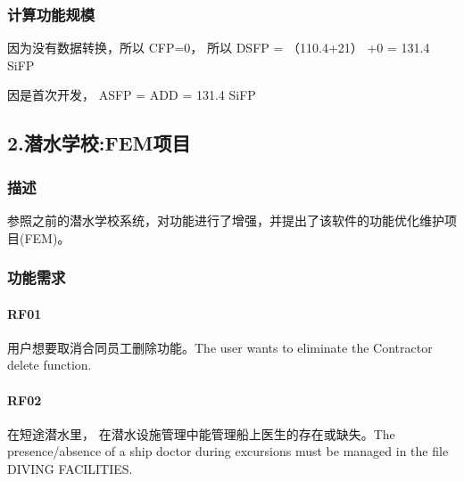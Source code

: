 \hypertarget{ux8ba1ux7b97ux529fux80fdux89c4ux6a21}{%
\subsubsection{计算功能规模}\label{ux8ba1ux7b97ux529fux80fdux89c4ux6a21}}

\begin{description}
\item[]
\end{description}

因为没有数据转换，所以 CFP=0， 所以 DSFP = （110.4+21） +0 = 131.4 SiFP

因是首次开发， ASFP = ADD = 131.4 SiFP

\hypertarget{ux6f5cux6c34ux5b66ux6821femux9879ux76ee}{%
\subsection{2.潜水学校:FEM项目}\label{ux6f5cux6c34ux5b66ux6821femux9879ux76ee}}

\hypertarget{ux63cfux8ff0}{%
\subsubsection{描述}\label{ux63cfux8ff0}}

参照之前的潜水学校系统，对功能进行了增强，并提出了该软件的功能优化维护项目(FEM)。

\hypertarget{ux529fux80fdux9700ux6c42}{%
\subsubsection{功能需求}\label{ux529fux80fdux9700ux6c42}}

\hypertarget{rf01}{%
\paragraph{RF01}\label{rf01}}

用户想要取消合同员工删除功能。The user wants to eliminate the Contractor
delete function.

\hypertarget{rf02}{%
\paragraph{RF02}\label{rf02}}

在短途潜水里， 在潜水设施管理中能管理船上医生的存在或缺失。The
presence/absence of a ship doctor during excursions must be managed in
the file DIVING FACILITIES.

